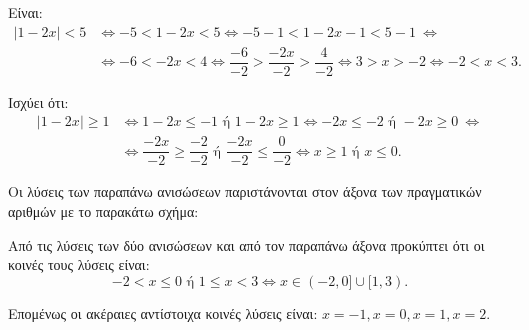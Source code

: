 
\begin{alist}
\item 
\begin{rlist}
\item Είναι:
\begin{align*}
|1 - 2x| < 5 &\Leftrightarrow -5 < 1 - 2x < 5 \Leftrightarrow -5 - 1 < 1 - 2x - 1 < 5 - 1 \ \Leftrightarrow \\
&\Leftrightarrow -6 < -2x < 4 \Leftrightarrow \dfrac{-6}{-2} > \dfrac{-2x}{-2} > \dfrac{4}{-2} \Leftrightarrow 3 > x > -2 \Leftrightarrow -2 < x < 3.
\end{align*}

\item Ισχύει ότι:
\begin{align*}
|1 - 2x| \ge 1 &\Leftrightarrow 1 - 2x \le -1 \text{ ή } 1 - 2x \ge 1 \Leftrightarrow -2x \le -2 \text{ ή } -2x \ge 0 \ \Leftrightarrow \\
&\Leftrightarrow \dfrac{-2x}{-2} \ge \dfrac{-2}{-2} \text{ ή } \dfrac{-2x}{-2} \le \dfrac{0}{-2} \Leftrightarrow x \ge 1 \text{ ή } x \le 0.
\end{align*}

Οι λύσεις των παραπάνω ανισώσεων παριστάνονται στον άξονα των πραγματικών αριθμών με το παρακάτω σχήμα:
\end{rlist}

\item Από τις λύσεις των δύο ανισώσεων και από τον παραπάνω άξονα προκύπτει ότι οι κοινές τους λύσεις είναι:
\[-2 < x \le 0 \text{ ή } 1 \le x < 3 \Leftrightarrow x \in (-2, 0] \cup [1, 3).\]

Επομένως οι ακέραιες αντίστοιχα κοινές λύσεις είναι: $x = -1, x = 0, x = 1, x = 2$.
\end{alist}

